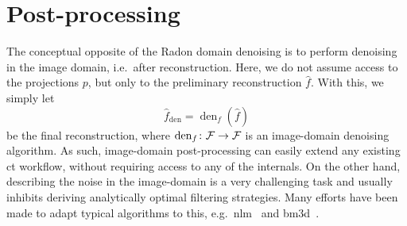 \documentclass[../ml-ct.tex]{subfiles}
\begin{document}
\section{Post-processing}
The conceptual opposite of the Radon domain denoising is to perform denoising in the image domain, i.e.\ after reconstruction.
Here, we do not assume access to the projections \( p \), but only to the preliminary reconstruction \( \hat{f} \).
With this, we simply let
\begin{equation}
	\hat{f}_\text{den} = \operatorname{den}_{f}(\hat{f})
\end{equation}
be the final reconstruction, where \( \operatorname{den}_{f}\colon\mathcal{F}\to\mathcal{F} \) is an image-domain denoising algorithm.
As such, image-domain post-processing can easily extend any existing \gls{ct} workflow, without requiring access to any of the internals.
On the other hand, describing the noise in the image-domain is a very challenging task and usually inhibits deriving analytically optimal filtering strategies.
Many efforts have been made to adapt typical algorithms to this, e.g.\ \gls{nlm}~\cite{chen_thoracic_2012,li_adaptive_2013,ma_low_2011} and \gls{bm3d}~\cite{kang_image_2013}.
\end{document}
